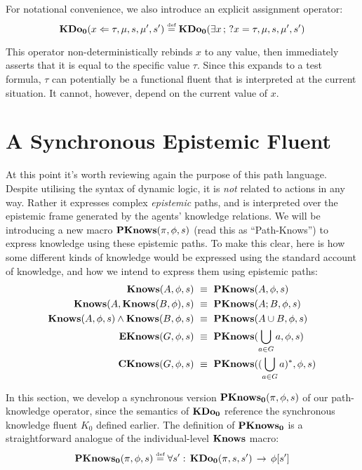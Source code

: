 For notational convenience, we also introduce an explicit assignment
operator:\[
\mathbf{KDo_{0}}(x\Leftarrow\tau,\mu,s,\mu',s')\stackrel{\mbox{\tiny def}}{=}\mathbf{KDo_{0}}(\exists x\,;\,?x=\tau,\mu,s,\mu',s')\]


This operator non-deterministically rebinds $x$ to any value, then
immediately asserts that it is equal to the specific value $\tau$.
Since this expands to a test formula, $\tau$ can potentially be a
functional fluent that is interpreted at the current situation. It
cannot, however, depend on the current value of $x$.


\section{A Synchronous Epistemic Fluent\label{sec:CKnowledge:Synchronous}}

At this point it's worth reviewing again the purpose of this path
language. Despite utilising the syntax of dynamic logic, it is \emph{not}
related to actions in any way. Rather it expresses complex \emph{epistemic}
paths, and is interpreted over the epistemic frame generated by the
agents' knowledge relations. We will be introducing a new macro $\mathbf{PKnows}(\pi,\phi,s)$
(read this as {}``Path-Knows'') to express knowledge using these
epistemic paths. To make this clear, here is how some different kinds
of knowledge would be expressed using the standard account of knowledge,
and how we intend to express them using epistemic paths:\begin{align}
\mathbf{Knows}(A,\phi,s) & \,\,\equiv\,\,\mathbf{PKnows}(A,\phi,s)\nonumber \\
\mathbf{Knows}(A,\mathbf{Knows}(B,\phi),s) & \,\,\equiv\,\,\mathbf{PKnows}(A;B,\phi,s)\nonumber \\
\mathbf{Knows}(A,\phi,s)\wedge\mathbf{Knows}(B,\phi,s) & \,\,\equiv\,\,\mathbf{PKnows}(A\cup B,\phi,s)\nonumber \\
\mathbf{EKnows}(G,\phi,s) & \,\,\equiv\,\,\mathbf{PKnows}(\bigcup_{a\in G}a,\phi,s)\nonumber \\
\mathbf{CKnows}(G,\phi,s) & \,\,\equiv\,\,\mathbf{PKnows}((\bigcup_{a\in G}a)^{*},\phi,s)\label{eq:pknows_identities}\end{align}


In this section, we develop a synchronous version $\mathbf{PKnows_{0}}(\pi,\phi,s)$
of our path-knowledge operator, since the semantics of $\mathbf{KDo_{0}}$ reference
the synchronous knowledge fluent $K_{0}$ defined earlier. The definition
of $\mathbf{PKnows_{0}}$ is a straightforward analogue of the individual-level
$\mathbf{Knows}$ macro:\[
\mathbf{PKnows_{0}}(\pi,\phi,s)\stackrel{\mbox{\tiny def}}{=}\forall s':\,\mathbf{KDo_{0}}(\pi,s,s')\,\rightarrow\,\phi[s']\]


